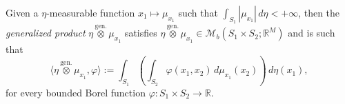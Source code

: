 \documentclass[reqno,10pt]{amsart}
\numberwithin{equation}{section}
\newtheorem{theorem}{Theorem}[section]
\newtheorem{proposition}[theorem]{Proposition}
\theoremstyle{remark}
\newcommand{\R}{\mathbb{R}}
\newcommand{\Mb}{\mathcal{M}_b}
\newcommand{\genprod}{\stackrel{\text{gen.}}{\otimes}}
\newcommand{\proj}{proj}
\begin{document}
Given a $\eta$-measurable function $x_1 \mapsto \mu_{x_1}$ such that $\int_{S_1}|\mu_{x_1}|\,d\eta<+\infty$, then the \emph{generalized product} $\eta \genprod \mu_{x_1}$ satisfies $ \eta \genprod \mu_{x_1} \in \Mb(S_1 \times S_2; \R^M )$ and is such that 
\[
	\langle \eta \genprod \mu_{x_1}, \varphi \rangle := \int_{S_1} \left( \int_{S_2} \varphi(x_1,x_2) \,d\mu_{x_1}(x_2) \right) \,d\eta(x_1),
\]
for every bounded Borel function $\varphi : S_1 \times S_2 \to \R$.



\end{document}
